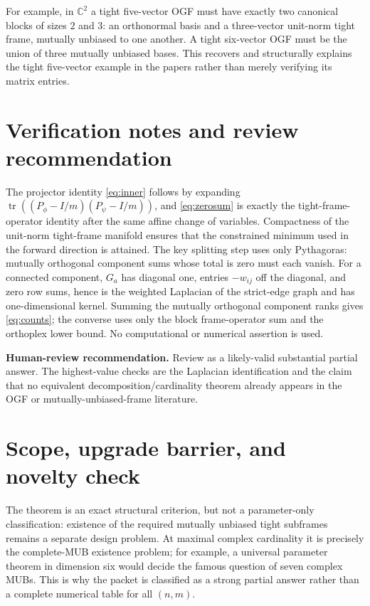 \documentclass[10pt]{article}
\newcommand{\C}{\mathbb C}
\begin{document}
For example, in $\C^2$ a tight five-vector OGF must have exactly two
canonical blocks of sizes $2$ and $3$: an orthonormal basis and a
three-vector unit-norm tight frame, mutually unbiased to one another.  A
tight six-vector OGF must be the union of three mutually unbiased bases.
This recovers and structurally explains the tight five-vector example in
the papers rather than merely verifying its matrix entries.

\section{Verification notes and review recommendation}

The projector identity \eqref{eq:inner} follows by expanding
$\operatorname{tr}((P_\phi-I/m)(P_\psi-I/m))$, and
\eqref{eq:zerosum} is exactly the tight-frame-operator identity after the
same affine change of variables.  Compactness of the unit-norm tight-frame
manifold ensures that the constrained minimum used in the forward direction
is attained.  The key splitting step uses only Pythagoras: mutually
orthogonal component sums whose total is zero must each vanish.  For a
connected component, $G_a$ has diagonal one, entries $-w_{ij}$ off the
diagonal, and zero row sums, hence is the weighted Laplacian of the strict-edge
graph and has one-dimensional kernel.  Summing the mutually orthogonal
component ranks gives \eqref{eq:counts}; the converse uses only the block
frame-operator sum and the orthoplex lower bound.  No computational or
numerical assertion is used.

\textbf{Human-review recommendation.} Review as a likely-valid substantial
partial answer.  The highest-value checks are the Laplacian identification
and the claim that no equivalent decomposition/cardinality theorem already
appears in the OGF or mutually-unbiased-frame literature.

\section{Scope, upgrade barrier, and novelty check}

The theorem is an exact structural criterion, but not a parameter-only
classification: existence of the required mutually unbiased tight
subframes remains a separate design problem.  At maximal complex cardinality
it is precisely the complete-MUB existence problem; for example, a universal
parameter theorem in dimension six would decide the famous question of seven
complex MUBs.  This is why the packet is classified as a strong partial
answer rather than a complete numerical table for all $(n,m)$.
\end{document}
